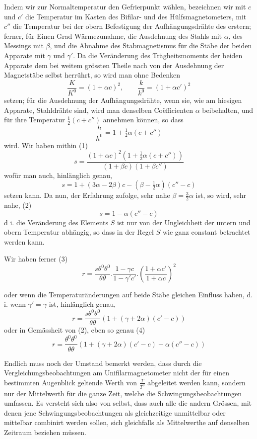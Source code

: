 Indem wir zur Normaltemperatur den Gefrierpunkt wählen, bezeichnen wir mit $c$ und $c'$ die Temperatur im Kasten des Bifilar- und des Hülfsmagnetometers, mit $c''$ die Temperatur bei der obern Befestigung der Aufhängungsdrähte des erstern; ferner, für Einen Grad Wärmezunahme, die Ausdehnung des Stahls mit $\alpha$, des Messings mit $\beta$, und die Abnahme des Stabmagnetismus für die Stäbe der beiden Apparate mit $\gamma$ und $\gamma'$. Da die Veränderung des Trägheitsmoments der beiden Apparate dem bei weitem grössten Theile nach von der Ausdehnung der Magnetstäbe selbst herrührt, so wird man ohne Bedenken
\[
\frac{K}{K^0}=(1+\alpha c)^2,\qquad \frac{k}{k^0}=(1+\alpha c')^2
\]
setzen; für die Ausdehnung der Aufhängungsdrähte, wenn sie, wie am hiesigen Apparate, Stahldrähte sind, wird man denselben Coëfficienten $\alpha$ beibehalten, und für ihre Temperatur $\tfrac{1}{2}(c+c'')$ annehmen können, so dass
\[
\frac{h}{h^0}=1+\tfrac{1}{2}\alpha(c+c'')
\]
wird. Wir haben mithin (1)
\[
s=\frac{(1+\alpha c)^2(1+\tfrac{1}{2}\alpha(c+c''))}{(1+\beta c)(1+\beta c'')}
\]
wofür man auch, hinlänglich genau,
\[
s=1+(3\alpha-2\beta)c-(\beta-\tfrac{1}{2}\alpha)(c''-c)
\]
setzen kann. Da nun, der Erfahrung zufolge, sehr nahe $\beta=\tfrac{3}{2}\alpha$ ist, so wird, sehr nahe, (2)
\[
s=1-\alpha(c''-c)
\]
d i. die Veränderung des Elements $S$ ist nur von der Ungleichheit der untern und obern Temperatur abhängig, so dass in der Regel $S$ wie ganz constant betrachtet werden kann.

Wir haben ferner (3)
\[
r=\frac{s\theta^0\theta^0}{\theta\theta}.\frac{1-\gamma c}{1-\gamma'c'}.\left(\frac{1+\alpha c'}{1+\alpha c}\right)^2
\]
\par\clearpage
{}
\noindent oder wenn die Temperaturänderungen auf beide Stäbe gleichen Einfluss haben, d. i. wenn $\gamma'=\gamma$ ist, hinlänglich genau,
\[
r=\frac{s\theta^0\theta^0}{\theta\theta}(1+(\gamma+2\alpha)(c'-c))
\]
oder in Gemässheit von (2), eben so genau (4)
\[
r=\frac{\theta^0\theta^0}{\theta\theta}(1+(\gamma+2\alpha)(c'-c)-\alpha(c''-c))
\]

Endlich muss noch der Umstand bemerkt werden, dass durch die Vergleichungsbeobachtungen am Unifilarmagnetometer nicht der für einen bestimmten Augenblick geltende Werth von $\frac{T}{T^0}$ abgeleitet werden kann, sondern nur der Mittelwerth für die ganze Zeit, welche die Schwingungsbeobachtungen umfassen. Es versteht sich also von selbst, dass auch alle die andern Grössen, mit denen jene Schwingungsbeobachtungen als gleichzeitige unmittelbar oder mittelbar combinirt werden sollen, sich gleichfalls als Mittelwerthe auf denselben Zeitraum beziehen müssen.

